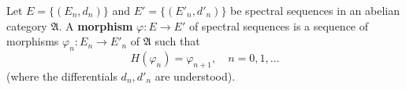 Let $E = \{(E_n, d_n)\}$ and $E' = \{(E'_n, d'_n)\}$ be spectral sequences in an abelian category $\mathfrak{A}$. A \textbf{morphism} $\varphi: E \to E'$ of spectral sequences is a sequence of morphisms $\varphi_n: E_n \to E'_n$ of $\mathfrak{A}$ such that
$$H(\varphi_n) = \varphi_{n+1}, \quad n = 0, 1, \ldots$$
(where the differentials $d_n, d'_n$ are understood).
